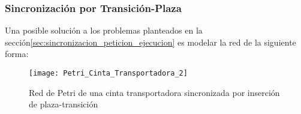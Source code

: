 \subsubsection{Sincronización por Transición-Plaza}
\label{sec:sincronizacion_peticion_ejecucion_transicion_plaza}
Una posible solución a los problemas planteados en la sección\ref{sec:sincronizacion_peticion_ejecucion} es
modelar la red de la siguiente forma:\\

\begin{figure}[H]
    \centering
    \texttt{[image: Petri\_Cinta\_Transportadora\_2]}
    \caption{Red de Petri de una cinta transportadora sincronizada por inserción
    de plaza-transición}
    \label{fig:petri_cinta_transportadora_2}
\end{figure}


